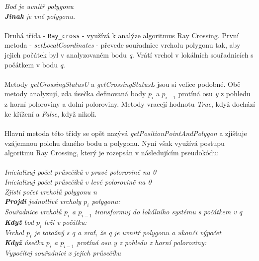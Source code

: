 \documentclass{article}
\begin{document}
\indent\indent\textit{Bod je uvnitř polygonu}\\
\indent\textit{\textbf{Jinak} je vně polygonu.}\\
\vspace{0.2cm}\\
Druhá třída  - \texttt{Ray\_cross} - využívá k analýze algoritmus Ray Crossing. První metoda - \emph{setLocalCoordinates} - převede souřadnice vrcholu polygonu tak, aby jejich počátek byl v analyzovaném bodu \emph{q}. Vrátí vrchol v lokálních souřadnicích s počátkem v bodu \emph{q}.\\
\vspace{0.2cm}\\
Metody \emph{getCrossingStatusU} a \emph{getCrossingStatusL} jsou si velice podobné. Obě metody analyzují, zda úsečka definovaná body $p_{i}$ a $p_{i-1}$ protíná osu \emph{y} z pohledu z horní poloroviny a dolní poloroviny. Metody vracejí hodnotu \emph{True}, když dochází ke křížení a \emph{False}, když nikoli.\\
\vspace{0.2cm}\\
Hlavní metoda této třídy se opět nazývá \emph{getPositionPointAndPolygon} a zjišťuje vzájemnou polohu daného bodu a polygonu. Nyní však využívá postupu algoritmu Ray Crossing, který je rozepsán v následujícím pseudokódu:\\
\vspace{0.2cm}\\
\indent\textit{Inicializuj počet průsečíků v pravé polorovině na 0}\\
\indent\textit{Inicializuj počet průsečíků v levé polorovině na 0}\\
\indent\textit{Zjisti počet vrcholů polygonu n}\\
\indent\textit{\textbf{Projdi} jednotlivé vrcholy $p_{i}$ polygonu:}\\
\indent\indent\textit{Souřadnice vrcholů $p_{i}$ a $p_{i-1}$ transformuj do lokálního systému s počátkem v q}\\
\indent\indent\textit{\textbf{Když} bod $p_{i}$ leží v počátku:}\\
\indent\indent\indent\textit{Vrchol $p_{i}$ je totožný s q a vrať, že q je uvnitř polygonu a ukonči výpočet}\\
\indent\indent\textit{\textbf{Když} úsečka $p_{i}$ a $p_{i-1}$ protíná osu y z pohledu z horní poloroviny:}\\
\indent\indent\indent\textit{Vypočítej souřadnici x jejich průsečíku}\\
\end{document}

